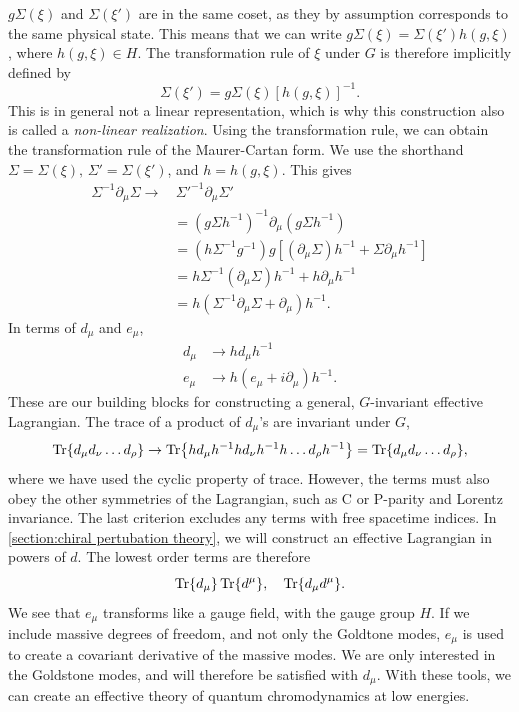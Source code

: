 $g\Sigma(\xi)$ and $\Sigma(\xi')$ are in the same coset, as they by assumption corresponds to the same physical state.
This means that we can write $g\Sigma(\xi) = \Sigma(\xi') h(g, \xi)$, where $h(g, \xi) \in H$.
The transformation rule of $\xi$ under $G$ is therefore implicitly defined by
\begin{equation}
    \Sigma(\xi') = g \Sigma(\xi) [h(g, \xi)]^{-1}.
\end{equation}
This is in general not a linear representation, which is why this construction also is called a \emph{non-linear realization}.
Using the transformation rule, we can obtain the transformation rule of the Maurer-Cartan form.
We use the shorthand $\Sigma = \Sigma(\xi),\, \Sigma' = \Sigma(\xi')$, and $h = h(g, \xi)$.
This gives
\begin{align*}
    \Sigma^{-1} \partial_\mu \Sigma
    \rightarrow 
    & \, \Sigma'^{-1} \partial_\mu \Sigma' \\
    & = (g \Sigma h^{-1})^{-1} \partial_\mu (g \Sigma h^{-1}) \\
    & = (h \Sigma^{-1} g^{-1}) g [(\partial_\mu \Sigma)h^{-1} + \Sigma \partial_\mu h^{-1}] \\
    & = h \Sigma^{-1} (\partial_\mu \Sigma) h^{-1}
    + h \partial_\mu h^{-1} \\
    & = h (\Sigma^{-1} \partial_\mu \Sigma + \partial_\mu) h^{-1}.
\end{align*}
In terms of $d_\mu$ and $e_\mu$,
\begin{align}
    d_\mu & \rightarrow h d_\mu h^{-1} \\
    e_\mu & \rightarrow h (e_\mu + i\partial_\mu )h^{-1}.
\end{align}
These are our building blocks for constructing a general, $G$-invariant effective Lagrangian.
The trace of a product of $d_\mu$'s are invariant under $G$,
\begin{equation}
    \Tr{d_\mu d_\nu \dots d_\rho} 
    \rightarrow
    \Tr{h d_\mu h^{-1} h d_\nu h^{-1} h \dots d_\rho h^{-1}}
    = \Tr{d_\mu d_\nu \dots d_\rho},
\end{equation}
where we have used the cyclic property of trace.
However, the terms must also obey the other symmetries of the Lagrangian, such as C or P-parity and Lorentz invariance.
The last criterion excludes any terms with free spacetime indices.
In \autoref{section:chiral pertubation theory}, we will construct an effective Lagrangian in powers of $d$.
The lowest order terms are therefore
\begin{equation}
    \label{first order terms CCWZ}
    \Tr{d_\mu} \Tr{d^\mu}, 
    \quad 
    \Tr{d_\mu d^\mu}.
\end{equation}
We see that $e_\mu$ transforms like a gauge field, with the gauge group $H$.
If we include massive degrees of freedom, and not only the Goldtone modes, $e_\mu$ is used to create a covariant derivative of the massive modes.
We are only interested in the Goldstone modes, and will therefore be satisfied with $d_\mu$.
With these tools, we can create an effective theory of quantum chromodynamics at low energies.

